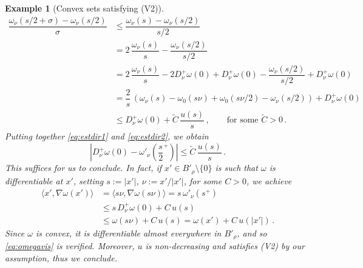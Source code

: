 \documentclass[a4paper,reqno,11pt]{amsart}
\newtheorem{example}[theorem]{Example}
\begin{document}
\begin{example}[Convex sets satisfying (V2)]
		\begin{align} \label{eq:estdir2}
			\dfrac{\omega_\nu(s/2 + \sigma) - \omega_\nu(s/2)}{\sigma} & \leq \dfrac{\omega_\nu (s) - \omega_\nu(s/2)}{s/2} \nonumber \\
			& = 2 \, \dfrac{\omega_\nu(s)}{s} - \dfrac{\omega_\nu(s/2)}{s/2} \nonumber\\
			& = 2 \, \dfrac{\omega_\nu(s)}{s} - 2 D^{+}_{\nu} \omega (0) + D^{+}_{\nu} \omega (0) - \dfrac{\omega_\nu(s/2)}{s/2} + D^{+}_{\nu} \omega (0) \\
			& = \dfrac{2}{s} \, \left(\omega_{\nu}(s) - \omega_0(s \nu) + \omega_0(s \nu / 2) - \omega_{\nu}(s/2) \right) + D^{+}_{\nu} \omega (0) \nonumber \\
			& \leq D^{+}_{\nu} \omega (0) + \tilde{C} \, \dfrac{u(s)}{s} \, , \qquad \text{for some $\tilde{C} > 0 \, .$} \nonumber
		\end{align}
		Putting together \eqref{eq:estdir1} and \eqref{eq:estdir2}, we obtain
		\begin{equation*}
			\left| D^{+}_{\nu} \omega (0) - \omega'_\nu \left( \frac{s}{2}^+ \right) \right| \leq \tilde{C} \, \dfrac{u(s)}{s} \, . %
		\end{equation*}
		This suffices for us to conclude. In fact, if $x' \in B'_{\rho} \setminus \{ 0 \}$ is such that $\omega$ is differentiable at $x'$, setting $s := |x'|$, $\nu := x'/|x'|$, for some $C > 0$, we achieve
		\begin{align*}
			\langle x' , \nabla \omega (x') \rangle & = \langle s \nu , \nabla \omega(s \nu) \rangle = s \, \omega'_\nu (s^+) \\
			& \leq s \, D^{+}_{\nu} \omega (0) + C \, u(s) \\
			& \leq \omega(s \nu) + C \, u(s) = \omega(x') + C \, u(|x'|) \, .
		\end{align*}
		Since $\omega$ is convex, it is differentiable almost everywhere in $B'_{\rho}$, and so \eqref{eq:omegavis} is verified. Moreover, $u$ is non-decreasing and satisfies (V2) by our assumption, thus we conclude.
\end{example}
\end{document}
